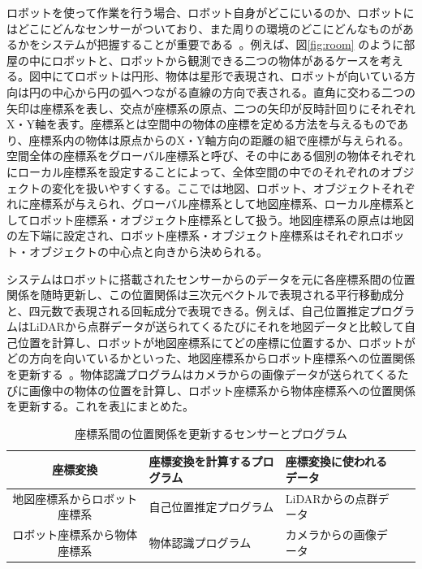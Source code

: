 \documentclass[a4paper]{jreport}	%
\begin{document}
ロボットを使って作業を行う場合、ロボット自身がどこにいるのか、ロボットにはどこにどんなセンサーがついており、また周りの環境のどこにどんなものがあるかをシステムが把握することが重要である~\cite{tf}。例えば、図\ref{fig:room} のように部屋の中にロボットと、ロボットから観測できる二つの物体があるケースを考える。図中にてロボットは円形、物体は星形で表現され、ロボットが向いている方向は円の中心から円の弧へつながる直線の方向で表される。直角に交わる二つの矢印は座標系を表し、交点が座標系の原点、二つの矢印が反時計回りにそれぞれX・Y軸を表す。座標系とは空間中の物体の座標を定める方法を与えるものであり、座標系内の物体は原点からのX・Y軸方向の距離の組で座標が与えられる。空間全体の座標系をグローバル座標系と呼び、その中にある個別の物体それぞれにローカル座標系を設定することによって、全体空間の中でのそれぞれのオブジェクトの変化を扱いやすくする。ここでは地図、ロボット、オブジェクトそれぞれに座標系が与えられ、グローバル座標系として地図座標系、ローカル座標系としてロボット座標系・オブジェクト座標系として扱う。地図座標系の原点は地図の左下端に設定され、ロボット座標系・オブジェクト座標系はそれぞれロボット・オブジェクトの中心点と向きから決められる。

システムはロボットに搭載されたセンサーからのデータを元に各座標系間の位置関係を随時更新し、この位置関係は三次元ベクトルで表現される平行移動成分と、四元数で表現される回転成分で表現できる。例えば、自己位置推定プログラムはLiDARから点群データが送られてくるたびにそれを地図データと比較して自己位置を計算し、ロボットが地図座標系にてどの座標に位置するか、ロボットがどの方向を向いているかといった、地図座標系からロボット座標系への位置関係を更新する~\cite{tf}。物体認識プログラムはカメラからの画像データが送られてくるたびに画像中の物体の位置を計算し、ロボット座標系から物体座標系への位置関係を更新する。これを表\ref{table:sensor-prog}にまとめた。

\begin{table}[h]
	\centering
	 \begin{tabular}{clll}
   \hline
    座標変換 & 座標変換を計算するプログラム & 座標変換に使われるデータ \\
    \hline \hline
   地図座標系からロボット座標系 & 自己位置推定プログラム & LiDARからの点群データ \\
   ロボット座標系から物体座標系 & 物体認識プログラム & カメラからの画像データ \\            
   \hline
  \end{tabular} 
  \caption{座標系間の位置関係を更新するセンサーとプログラム}
	\label{table:sensor-prog}
\end{table}
\end{document}
